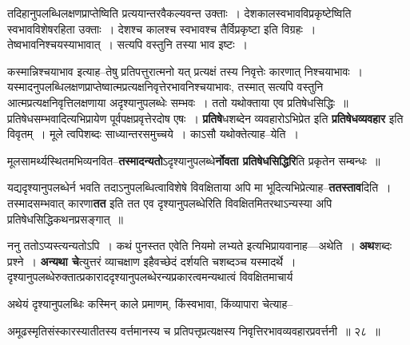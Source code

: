 \documentclass[article,12pt,a4paper]{memoir}
\begin{document}
	तदिहानुपलब्धिलक्षणप्राप्तेष्विति प्रत्ययान्तरवैकल्यवन्त उक्ताः । देशकालस्वभावविप्रकृष्टेष्विति स्वभावविशेषरहिता उक्ताः । देशश्च कालश्च स्वभावश्च तैर्विप्रकृष्टा इति विग्रहः । तेष्वभावनिश्चयस्याभावात् । सत्यपि वस्तुनि तस्या भाव इष्टः ।  
	  
	कस्मान्निश्चयाभाव इत्याह--तेषु प्रतिपत्तुरात्मनो यत् प्रत्यक्षं तस्य निवृत्तेः कारणात् निश्चयाभावः । यस्मादनुपलब्धिलक्षणप्राप्तेष्वात्मप्रत्यक्षनिवृत्तेरभावनिश्चयाभावः, तस्मात् सत्यपि वस्तुनि आत्मप्रत्यक्षनिवृत्तिलक्षणाया अदृश्यानुपलब्धेः सम्भवः । ततो यथोक्ताया एव प्रतिषेधसिद्धिः ॥ प्रतिषेधसम्भवादित्यभिप्रायेण पूर्वपक्षप्रवृत्तेरदोष एषः । \textbf{प्रतिषे}धशब्देन व्यवहारोऽभिप्रेत इति \textbf{प्रतिषेधव्यवहार} इति विवृतम् । मूले त्वपिशब्दः साध्यान्तरसमुच्चये । काऽसौ यथोक्तेत्याह--येति ।
	\pend
      

	  \pstart मूलसामर्थ्यस्थितमभिव्यनवित--\textbf{तस्मादन्यतो}ऽदृश्यानुपलब्धे\textbf{र्नोवता प्रतिषेधसिद्धिरि}ति प्रकृतेन सम्बन्धः ॥
	\pend
      

	  \pstart यद्यदृश्यानुपलब्धेर्न भवति तदाऽनुपलब्धित्वाविशेषे विवक्षिताया अपि मा भूदित्यभिप्रेत्याह--\textbf{ततस्ताव}दिति । तस्मादसम्भवात् कारणा\textbf{तत} इति तत एव दृश्यानुपलब्धेरिति विवक्षितमितरथाऽन्यस्या अपि प्रतिषेधसिद्धिकथनप्रसङ्गात् ॥
	\pend
      

	  \pstart ननु ततोऽप्यस्त्यन्यतोऽपि । कथं पुनस्तत एवेति नियमो लभ्यते इत्यभिप्रायवानाह—अथेति । \textbf{अथ}शब्दः प्रश्ने । \textbf{अन्यथा चे}त्युत्तरं व्याचक्षाण इहैवच्छेदं दर्शयति चशब्दञ्च यस्मादर्थे । दृश्यानुपलब्धेरुक्तात्प्रकाराददृश्यानुपलब्धेरन्यप्रकारत्वमन्यथात्वं विवक्षितमाचार्य  \leavevmode{} 
	  
	अथेयं दृश्यानुपलब्धिः कस्मिन् काले प्रमाणम्, किंस्वभावा, किंव्यापारा चेत्याह--  
	  
	अमूढस्मृतिसंस्कारस्यातीतस्य वर्त्तमानस्य च प्रतिपत्तृप्रत्यक्षस्य निवृत्तिरभावव्यवहारप्रवर्त्तनी ॥ २८ ॥ 
	  
\end{document}
